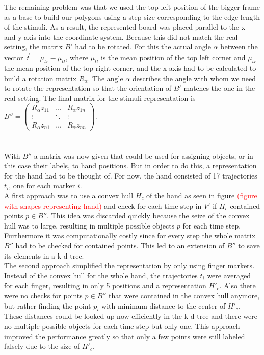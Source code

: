 The remaining problem was that we used the top left position of the bigger frame as a base to build our polygons using a step size corresponding to the edge length of the stimuli. As a result, the represented board was placed parallel to the x- and y-axis into the coordinate system. Because this did not match the real setting, the matrix $ B' $ had to be rotated. For this the actual angle $ \alpha $ between the vector $\vec{t} = \mu_{tr} - \mu_{tl}$, where $\mu_{tl}$ is the mean position of the top left corner and $\mu_{tr}$ the mean position of the top right corner,  and the x-axis had to be calculated to build a rotation matrix $ R_{\alpha} $. The angle $\alpha$ describes the angle with whom we need to rotate the representation so that the orientation of $ B' $ matches the one in the real setting. The final matrix for the stimuli representation is $ B''  = \begin{pmatrix}
 R_{\alpha}z_{11} & \hdots &  R_{\alpha}z_{1n} \\
\vdots & \ddots & \vdots \\
 R_{\alpha}z_{n1} & \hdots &  R_{\alpha}z_{nn}
\end{pmatrix}$.\\
\\
\\
With $ B'' $ a matrix was now given that could be used for assigning objects, or in this case their labels, to hand positions. But in order to do this, a representation for the hand had to be thought of. For now, the hand consisted of 17 trajectories $ t_{i} $, one for each marker $ i $. \\
A first approach was to use a convex hull $ H_{c} $ of the hand as seen in figure \textcolor{red}{(figure with shapes representing hand)} and check for each time step in $ V' $ if $ H_{c} $ contained points $ p \in B'' $. This idea was discarded quickly because the seize of the convex hull was to large, resulting in multiple possible objects $ p $ for each time step. Furthermore it was computationally costly since for every step the whole matrix $ B'' $ had to be checked for contained points. This led to an extension of $ B'' $ to save its elements in a k-d-tree.\\
The second approach simplified the representation by only using finger markers. Instead of the convex hull for the whole hand, the trajectories $ t_{i} $ were averaged for each finger, resulting in only 5 positions and a representation $ H'_{c} $. Also there were no checks for points $ p \in B'' $ that were contained in the convex hull anymore, but rather finding the point $ p_{i} $ with minimum distance to the center of $ H'_{c} $. These distances could be looked up now efficiently in the k-d-tree and there were no multiple possible objects for each time step but only one. This approach improved the performance greatly so that only a few points were still labeled falsely due to the size of $ H'_{c} $.\\
